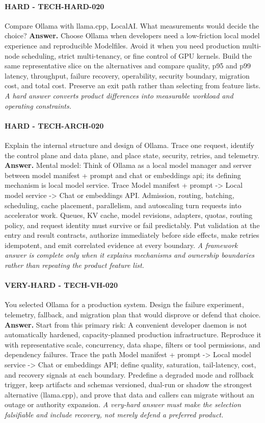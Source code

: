 \paragraph{HARD - TECH-HARD-020} Compare Ollama with llama.cpp, LocalAI. What measurements would decide the choice?
\textbf{Answer.} Choose Ollama when developers need a low-friction local model experience and reproducible Modelfiles. Avoid it when you need production multi-node scheduling, strict multi-tenancy, or fine control of GPU kernels. Build the same representative slice on the alternatives and compare quality, p95 and p99 latency, throughput, failure recovery, operability, security boundary, migration cost, and total cost. Preserve an exit path rather than selecting from feature lists.
\textit{A hard answer converts product differences into measurable workload and operating constraints.}
\paragraph{HARD - TECH-ARCH-020} Explain the internal structure and design of Ollama. Trace one request, identify the control plane and data plane, and place state, security, retries, and telemetry.
\textbf{Answer.} Mental model: Think of Ollama as a local model manager and server between model manifest + prompt and chat or embeddings api; its defining mechanism is local model service. Trace Model manifest + prompt -> Local model service -> Chat or embeddings API. Admission, routing, batching, scheduling, cache placement, parallelism, and autoscaling turn requests into accelerator work. Queues, KV cache, model revisions, adapters, quotas, routing policy, and request identity must survive or fail predictably. Put validation at the entry and result contracts, authorize immediately before side effects, make retries idempotent, and emit correlated evidence at every boundary.
\textit{A framework answer is complete only when it explains mechanisms and ownership boundaries rather than repeating the product feature list.}
\paragraph{VERY-HARD - TECH-VH-020} You selected Ollama for a production system. Design the failure experiment, telemetry, fallback, and migration plan that would disprove or defend that choice.
\textbf{Answer.} Start from this primary risk: A convenient developer daemon is not automatically hardened, capacity-planned production infrastructure. Reproduce it with representative scale, concurrency, data shape, filters or tool permissions, and dependency failures. Trace the path Model manifest + prompt -> Local model service -> Chat or embeddings API; define quality, saturation, tail-latency, cost, and recovery signals at each boundary. Predefine a degraded mode and rollback trigger, keep artifacts and schemas versioned, dual-run or shadow the strongest alternative (llama.cpp), and prove that data and callers can migrate without an outage or authority expansion.
\textit{A very-hard answer must make the selection falsifiable and include recovery, not merely defend a preferred product.}

